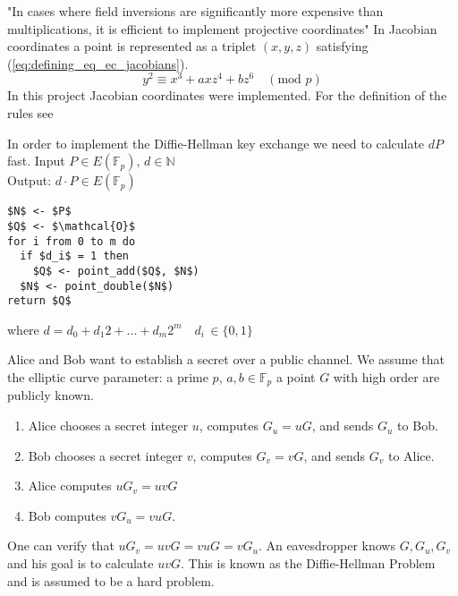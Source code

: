 "In cases where field inversions are significantly more expensive than multiplications, it is efficient to implement projective coordinates" \cite{Blake:1999} In Jacobian coordinates a point is represented as a triplet $(x,y,z)$ satisfying (\ref{eq:defining_eq_ec_jacobians}).
\begin{equation}\label{eq:defining_eq_ec_jacobians}
y^2 \equiv x^3 + axz^4 + bz^6 \quad (\text{mod } p)
\end{equation}
In this project Jacobian coordinates were implemented. For the definition of the rules see \cite[p. 59-60]{Blake:1999}

In order to implement the Diffie-Hellman key exchange we need to calculate $dP$ fast.
Input $P \in E(\mathbb{F}_p)$, $d \in \mathbb{N}$\\
Output: $d\cdot P \in E(\mathbb{F}_p)$
\begin{lstlisting}[frame=single, mathescape=true, captionpos=b, caption=double-and-add method]
$N$ <- $P$
$Q$ <- $\mathcal{O}$
for i from 0 to m do
  if $d_i$ = 1 then
    $Q$ <- point_add($Q$, $N$)
  $N$ <- point_double($N$)
return $Q$
\end{lstlisting}
where $d = d_0 + d_1 2 + ... + d_m 2^m \quad d_i \, \in \{0,1\}$

Alice and Bob want to establish a secret over a public channel. We assume that the elliptic curve parameter: a prime $p$, $a, b \in \mathbb{F}_p$ a point $G$ with high order are publicly known.
\begin{enumerate}
\item{Alice chooses a secret integer $u$, computes $G_u = uG$, and sends $G_u$ to Bob.}
\item{Bob chooses a secret integer $v$, computes $G_v = vG$, and sends $G_v$ to Alice.}
\item{Alice computes $uG_v = uvG$}
\item{Bob computes $vG_u = vuG$.}
\end{enumerate}
One can verify that $uG_v = uvG = vuG = v G_u$. An eavesdropper knows $G, G_u, G_v$ and his goal is to calculate $uvG$. This is known as the Diffie-Hellman Problem and is assumed to be a hard problem. 



